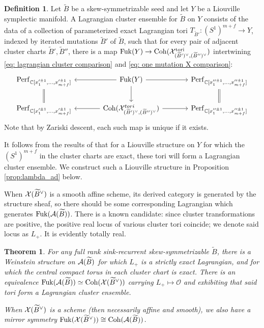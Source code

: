 \documentclass[12pt, letter]{amsart}
\DeclareMathOperator{\Fuk}{Fuk}
\newtheorem{theorem}[dummy]{Theorem}
\theoremstyle{definition}
\newtheorem{definition}[dummy]{Definition}
\begin{document}
\begin{definition}
    Let $\widetilde{B}$ be a skew-symmetrizable seed and let $Y$ be a  Liouville symplectic manifold.  A   Lagrangian cluster ensemble for $\widetilde{B}$ on $Y$ consists of the data of a collection of parameterized exact Lagrangian tori $T_{\widetilde{B}'}: (S^1)^{m+f} \to Y$, indexed by iterated mutations $\widetilde{B}'$ of $\widetilde{B}$, such that for every pair of adjacent cluster charts $\widetilde{B}', \widetilde{B}''$,  there is a map $\Fuk(Y) \to \Coh(\cX^{\mathrm{tori}}_{(\widetilde{B}')^\vee, (\widetilde{B}'')^\vee})$ intertwining \eqref{eq: lagrangian cluster comparison} and \eqref{eq: one mutation X comparison}:
    \[
 \begin{tikzcd}[column sep=large]
\Perf_{\C[x_1'^{\pm1}, \ldots, x_{m+f}'^{\pm1}]} \arrow[d, equal] & \Fuk(Y) \arrow[l] \arrow[r] \arrow[d] & \Perf_{\C[x_1''^{\pm1}, \ldots, x_{m+f}''^{\pm1}]} \arrow[d, equal] \\
\Perf_{\C[x_1'^{\pm1}, \ldots, x_{m+f}'^{\pm1}]}  & \Coh(\cX^{tori}_{(\widetilde{B}')^\vee, (\widetilde{B}'')^\vee}) \arrow[l] \arrow[r] & \Perf_{\C[x_1''^{\pm1}, \ldots, x_{m+f}''^{\pm1}]} 
 \end{tikzcd}
\]
Note that by Zariski descent, each such map is unique if it exists. 
\end{definition}

It follows from the results of \cite{PT, GLe} that for a Liouville structure on $Y$ for which the $(S^1)^{m+f}$ in the cluster charts are exact, these tori will form a Lagrangian cluster ensemble. We  construct such a Liouville structure in Proposition \ref{prop:lambda_ad} below.


When $\mathcal{X}(\widetilde B^\vee)$  is a smooth affine scheme, its derived category is generated by the structure sheaf, so there should be some corresponding Lagrangian which generates $\Fuk(\cA(\widetilde B))$.  There is a known candidate: since cluster transformations are positive, the positive real locus of  various cluster tori coincide; we denote said locus as $L_+$.  It is evidently totally real.

\begin{theorem} \label{thm:main} For any full rank sink-recurrent skew-symmetrizable \(\widetilde B\), there is a Weinstein structure on $\mathcal{A}(\widetilde B)$ for which $L_+$ is a strictly exact Lagrangian, and for which the central compact torus in each cluster chart is exact.   There is  an equivalence 
$\Fuk( \cA(\widetilde B) ) \simeq \Coh( \cX (\widetilde B^\vee))$ carrying $L_+ \mapsto \mathcal{O}$ and exhibiting that said tori form a Lagrangian cluster ensemble.  

When $\mathcal{X} (\widetilde B^\vee)$ is a scheme (then necessarily affine and smooth), we also have a mirror symmetry 
$\Fuk(\cX (\widetilde B^\vee)) \cong \Coh(\cA( \widetilde{B}))$.
\end{theorem}
\end{document}
